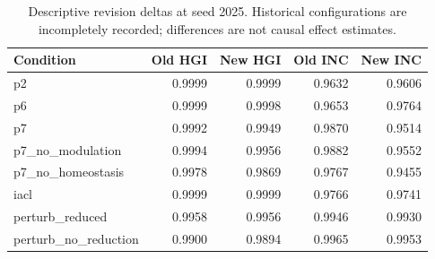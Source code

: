 \begin{table}[htbp]
\centering\small
\caption{Descriptive revision deltas at seed 2025. Historical configurations are incompletely recorded; differences are not causal effect estimates.}
\label{tab:revision-deltas}
\begin{tabular}{lrrrr}
\toprule
Condition & Old HGI & New HGI & Old INC & New INC \\
\midrule
p2 & 0.9999 & 0.9999 & 0.9632 & 0.9606 \\
p6 & 0.9999 & 0.9998 & 0.9653 & 0.9764 \\
p7 & 0.9992 & 0.9949 & 0.9870 & 0.9514 \\
p7\_no\_modulation & 0.9994 & 0.9956 & 0.9882 & 0.9552 \\
p7\_no\_homeostasis & 0.9978 & 0.9869 & 0.9767 & 0.9455 \\
iacl & 0.9999 & 0.9999 & 0.9766 & 0.9741 \\
perturb\_reduced & 0.9958 & 0.9956 & 0.9946 & 0.9930 \\
perturb\_no\_reduction & 0.9900 & 0.9894 & 0.9965 & 0.9953 \\
\bottomrule
\end{tabular}
\end{table}
